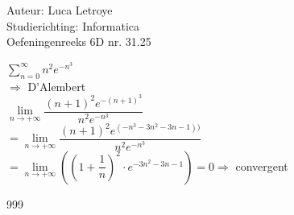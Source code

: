 \documentclass[a4paper]{article}
\begin{document}
  
\noindent \large Auteur: Luca Letroye \\
\noindent \large Studierichting: Informatica\\
\noindent \large Oefeningenreeks 6D nr. 31.25

\medskip
\normalsize

$ \displaystyle\sum_{n=0}^{\infty} n^2e^{-n^3}$\\

$\Rightarrow $ D'Alembert\\

$\lim\limits_{n\rightarrow +\infty} \dfrac{(n+1)^2e^{-(n+1)^3}}{n^2e^{-n^3}}$\\

$ = \lim\limits_{n\rightarrow +\infty} \dfrac{(n+1)^2e^{(-n^3-3n^2-3n-1))}}{n^2e^{-n^3}}$\\

$ = \lim\limits_{n\rightarrow +\infty} \left(\left(1+\dfrac{1}{n}\right)^2\cdot e^{-3n^2-3n-1} \right) = 0 \Rightarrow $ convergent\\








\begin{thebibliography}{999}
\end{thebibliography}
\end{document}
